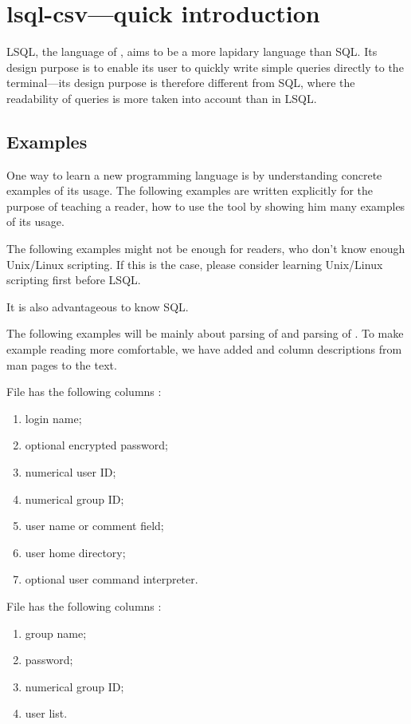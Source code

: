 \section{lsql-csv---quick introduction}
LSQL, the language of , aims to be a more lapidary language than SQL. Its design purpose is to enable its user to quickly write simple queries directly to the terminal---its design purpose is therefore different from SQL, where the readability of queries is more taken into account than in LSQL.

\subsection{Examples}
One way to learn a new programming language is by understanding concrete examples of its usage. The following examples are written explicitly for the purpose of teaching a reader, how to use the tool  by showing him many examples of its usage.

The following examples might not be enough for readers, who don't know enough Unix/Linux scripting. If this is the case, please consider learning Unix/\allowbreak Linux scripting first before LSQL.

It is also advantageous to know SQL.

The following examples will be mainly about parsing of  and parsing of . To make example reading more comfortable, we have added  and  column descriptions from man pages to the text.

File  has the following columns \cite{passwd}:
\begin{enumerate}
    \item login name;
    \item optional encrypted password;
    \item numerical user ID;
    \item numerical group ID;    
    \item user name or comment field;
    \item user home directory;
    \item optional user command interpreter.
\end{enumerate}
File  has the following columns \cite{group}:
\begin{enumerate}
    \item group name;
    \item password;
    \item numerical group ID;
    \item user list.
\end{enumerate}


